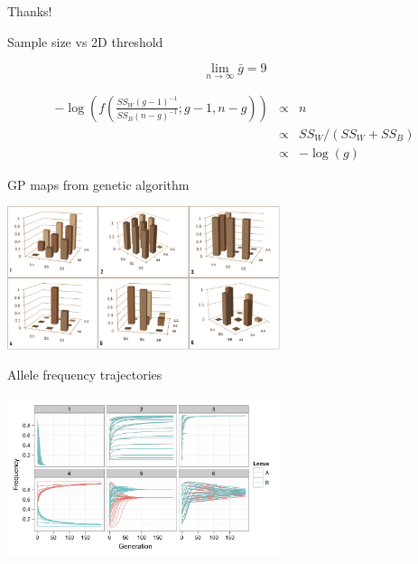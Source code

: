 \documentclass{beamer}
\begin{document}
\begin{frame}
\centering
Thanks!
\end{frame}


\begin{frame}{Sample size vs 2D threshold}


\begin{equation}
\lim_{n \to \infty} \bar{g} = 9 \nonumber
\end{equation}

\begin{eqnarray}
-\log \left ( f \left (
\frac{
 SS_{W}  (g - 1)^{-1}
}
{  SS_{B} (n - g)^{-1}
}; g - 1, n - g
\right ) \right )
& \propto &
 n \nonumber \\ 
& \propto &
SS_{W} / (SS_{W} + SS_{B}) \nonumber \\
& \propto &
-\log(g) \nonumber
\label{eq:ftest_n}
\end{eqnarray}

\end{frame}



\begin{frame}{GP maps from genetic algorithm}
\begin{center}
\includegraphics[width=8cm]{gpmaps2.pdf}
\end{center}
\end{frame}

\begin{frame}{Allele frequency trajectories}
\begin{center}
\includegraphics[width=8cm]{allelefreq_det.png}
\end{center}
\end{frame}
\end{document}
